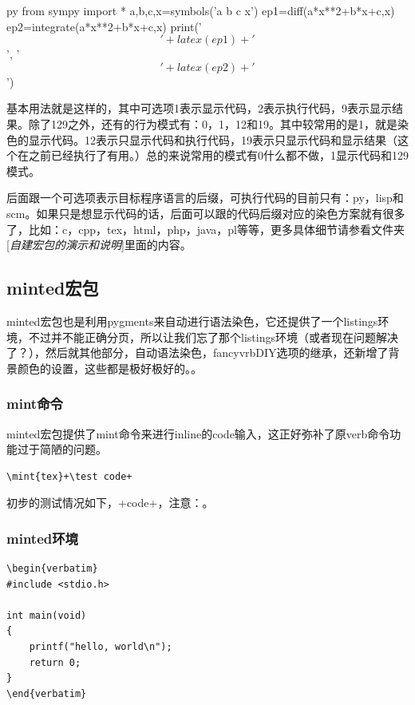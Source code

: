\documentclass[12pt,oneside]{book}
\begin{document}
\begin{common-format}
\begin{xverbatim}[129]{py}
from sympy import *
a,b,c,x=symbols('a b c x') 
ep1=diff(a*x**2+b*x+c,x)
ep2=integrate(a*x**2+b*x+c,x)
print('$$' + latex(ep1) + '$$', '$$' + latex(ep2) + '$$')
\end{xverbatim}

基本用法就是这样的，其中可选项1表示显示代码，2表示执行代码，9表示显示结果。除了129之外，还有的行为模式有：0，1，12和19。其中较常用的是1，就是染色的显示代码。12表示只显示代码和执行代码，19表示只显示代码和显示结果（这个在之前已经执行了有用。）总的来说常用的模式有0什么都不做，1显示代码和129模式。

后面跟一个可选项表示目标程序语言的后缀，可执行代码的目前只有：py，lisp和scm。如果只是想显示代码的话，后面可以跟的代码后缀对应的染色方案就有很多了，比如：c，cpp，tex，html，php，java，pl等等，更多具体细节请参看文件夹[\textit{自建宏包的演示和说明}]里面的内容。


\subsection{minted宏包}
minted宏包也是利用pygments来自动进行语法染色，它还提供了一个listings环境，不过并不能正确分页，所以让我们忘了那个listings环境（或者现在问题解决了？），然后就其他部分，自动语法染色，fancyvrbDIY选项的继承，还新增了背景颜色的设置，这些都是极好极好的。。

\subsubsection{mint命令}
minted宏包提供了mint命令来进行inline的code输入，这正好弥补了原verb命令功能过于简陋的问题。

\begin{Verbatim}
\mint{tex}+\test code+
\end{Verbatim}

初步的测试情况如下，+\test code+，注意：。

\subsubsection{minted环境}
\begin{Verbatim}
\begin{verbatim}
#include <stdio.h>

int main(void)
{
    printf("hello, world\n");
    return 0;
}
\end{verbatim}
\end{Verbatim}


\end{common-format}
\end{document}

